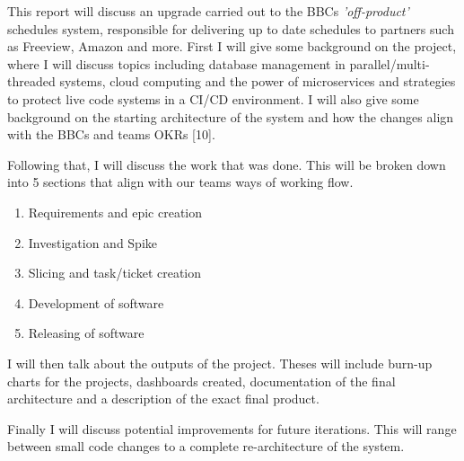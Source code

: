   This report will discuss an upgrade carried out to the BBCs \textit{'off-product'} schedules system, responsible for delivering up to date schedules to
  partners such as Freeview, Amazon and more. First I will give some background on the project, where I will discuss topics including database
  management in parallel/multi-threaded systems, cloud computing and the power of microservices and strategies to protect live code systems in a CI/CD
  environment. I will also give some background on the starting architecture of the system and how the changes align with the BBCs and teams OKRs [10].
  
  \newpage

  Following that, I will discuss the work that was done. This will be broken down into 5 sections that align with our teams ways of working flow.
  \begin{enumerate}
    \item Requirements and epic creation
    \item Investigation and Spike
    \item Slicing and task/ticket creation
    \item Development of software
    \item Releasing of software
  \end{enumerate}

  I will then talk about the outputs of the project. Theses will include burn-up charts for the projects, dashboards created, documentation of the final 
  architecture and a description of the exact final product.

  Finally I will discuss potential improvements for future iterations. This will range between small code changes to a complete re-architecture of the system.
\newpage
